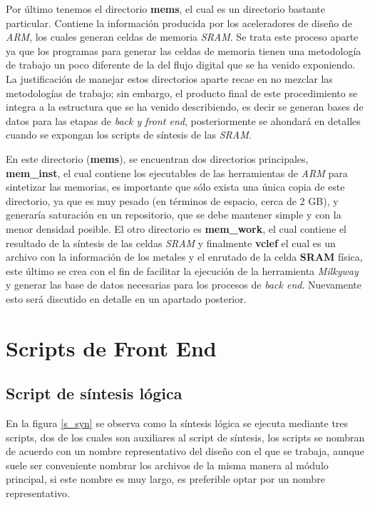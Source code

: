 Por último tenemos el directorio \textbf{mems}, el cual es un directorio bastante particular. Contiene la información producida por los aceleradores de diseño de \textit{ARM}, los cuales generan celdas de memoria \textit{SRAM}. Se trata este proceso aparte ya que los programas para generar las celdas de memoria tienen una metodología de trabajo un poco diferente de la del flujo digital que se ha venido exponiendo. La justificación de manejar estos directorios aparte recae en no mezclar las metodologías de trabajo; sin embargo, el producto final de este procedimiento se integra a la estructura que se ha venido describiendo, es decir se generan bases de datos para las etapas de \textit {back y front end}, posteriormente se ahondará en detalles cuando se expongan los scripts de síntesis de las \textit{SRAM}.

En este directorio (\textbf{mems}), se encuentran dos directorios principales, \textbf{mem\_inst}, el cual contiene los ejecutables de las herramientas de \textit{ARM} para sintetizar las memorias, es importante que sólo exista una única copia de este directorio, ya que es muy pesado (en términos de espacio, cerca de 2 GB), y generaría saturación en un repositorio, que se debe mantener simple y con la menor densidad posible. El otro directorio es \textbf{mem\_work}, el cual contiene el resultado de la síntesis de las celdas \textit{SRAM} y finalmente \textbf{vclef} el cual es un archivo con la información de los metales y el enrutado de la celda \textbf{SRAM} física, este último se crea con el fin de facilitar la ejecución de la herramienta \textit{Milkyway} y generar las base de datos necesarias para los procesos de \textit{back end}. Nuevamente esto será discutido en detalle en un apartado posterior.



\section{Scripts de Front End}

\subsection{Script de síntesis lógica}
\label{script_syn}
En la figura \ref{s_syn} se observa como la síntesis lógica se ejecuta mediante tres scripts, dos de los cuales son auxiliares al script de síntesis, los scripts se nombran de acuerdo con un nombre representativo del diseño con el que se trabaja, aunque suele ser conveniente nombrar los archivos de la misma manera al módulo principal, si este nombre es muy largo, es preferible optar por un nombre representativo.

